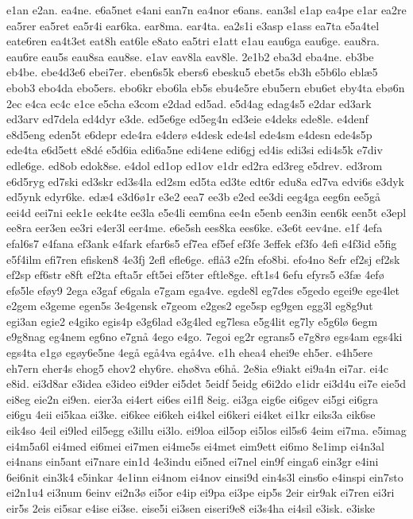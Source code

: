 {e1an
e2an.
ea4ne.
e6a5net
e4ani
ean7n
ea4nor
e6ans.
ean3sl
e1ap
ea4pe
e1ar
ea2re
ea5rer
ea5ret
ea5r4i
ear6ka.
ear8ma.
ear4ta.
ea2s1i
e3asp
e1ass
ea7ta
e5a4tel
eate6ren
ea4t3et
eat8h
eat6le
e8ato
ea5tri
e1att
e1au
eau6ga
eau6ge.
eau8ra.
eau6re
eau5s
eau8sa
eau8se.
e1av
eav8la
eav8le.
2e1b2
eba3d
eba4ne.
eb3be
eb4be.
ebe4d3e6
ebei7er.
eben6s5k
ebers6
ebesku5
ebet5s
eb3h
e5b6lo
eblæ5
ebob3
ebo4da
ebo5ers.
ebo6kr
ebo6la
eb5s
ebu4e5re
ebu5ern
ebu6et
eby4ta
ebø6n
2ec
e4ca
ec4c
e1ce
e5cha
e3com
e2dad
ed5ad.
e5d4ag
edag4s5
e2dar
ed3ark
ed3arv
ed7dela
ed4dyr
e3de.
ed5e6ge
ed5eg4n
ed3eie
e4deks
ede8le.
e4denf
e8d5eng
eden5t
e6depr
ede4ra
e4derø
e4desk
ede4sl
ede4sm
e4desn
ede4s5p
ede4ta
e6d5ett
e8dé
e5d6ia
edi6a5ne
edi4ene
edi6gj
ed4is
edi3si
edi4s5k
e7div
edle6ge.
ed8ob
edok8se.
e4dol
ed1op
ed1ov
e1dr
ed2ra
ed3reg
e5drev.
ed3rom
e6d5ryg
ed7ski
ed3skr
ed3s4la
ed2sm
ed5ta
ed3te
edt6r
edu8a
ed7va
edvi6s
e3dyk
ed5ynk
edyr6ke.
edæ4
e3d6ø1r
e3e2
eea7
ee3b
e2ed
ee3di
eeg4ga
eeg6n
ee5gå
eei4d
eei7ni
eek1e
eek4te
ee3la
e5e4li
eem6na
ee4n
e5enb
een3in
een6k
een5t
e3epl
ee8ra
eer3en
ee3ri
e4er3l
eer4me.
e6e5sh
ees8ka
ees6ke.
e3e6t
eev4ne.
e1f
4efa
efal6s7
e4fana
ef3ank
e4fark
efar6s5
ef7ea
ef5ef
ef3fe
3effek
ef3fo
4efi
e4f3id
e5fig
e5f4ilm
efi7ren
efisken8
4e3fj
2efl
efle6ge.
eflå3
e2fn
efo8bi.
efo4no
8efr
ef2sj
ef2sk
ef2sp
ef6str
e8ft
ef2ta
efta5r
eft5ei
ef5ter
eftle8ge.
eft1s4
6efu
efyrs5
e3fæ
4efø
efø5le
eføy9
2ega
e3gaf
e6gala
e7gam
ega4ve.
egde8l
eg7des
e5gedo
egei9e
ege4let
e2gem
e3geme
egen5s
3e4gensk
e7geom
e2ges2
ege5sp
eg9gen
egg3l
eg8g9ut
egi3an
egie2
e4giko
egis4p
e3g6lad
e3g4led
eg7lesa
e5g4lit
eg7ly
e5g6lø
6egm
e9g8nag
eg4nem
eg6no
e7gnå
4ego
e4go.
7egoi
eg2r
egrans5
e7g8rø
egs4am
egs4ki
egs4ta
e1gø
egøy6e5ne
4egå
egå4va
egå4ve.
e1h
ehea4
ehei9e
eh5er.
e4h5ere
eh7ern
eher4s
ehog5
ehov2
ehy6re.
ehø8va
e6hå.
2e8ia
e9iakt
ei9a4n
ei7ar.
ei4c
e8id.
ei3d8ar
e3idea
e3ideo
ei9der
ei5det
5eidf
5eidg
e6i2do
e1idr
ei3d4u
ei7e
eie5d
ei8eg
eie2n
ei9en.
eier3a
ei4ert
ei6es
ei1fl
8eig.
ei3ga
eig6e
ei6gev
ei5gi
ei6gra
ei6gu
4eii
ei5kaa
ei3ke.
ei6kee
ei6keh
ei4kel
ei6keri
ei4ket
ei1kr
eiks3a
eik6se
eik4so
4eil
ei9led
eil5egg
e3illu
ei3lo.
ei9loa
eil5op
ei5los
eil5s6
4eim
ei7ma.
e5imag
ei4m5a6l
ei4med
ei6mei
ei7men
ei4me5s
ei4met
eim9ett
ei6mo
8e1imp
ei4n3al
ei4nans
ein5ant
ei7nare
ein1d
4e3indu
ei5ned
ei7nel
ein9f
einga6
ein3gr
e4ini
6ei6nit
ein3k4
e5inkar
4e1inn
ei4nom
ei4nov
einsi9d
ein4s3l
eins6o
e4inspi
ein7sto
ei2n1u4
ei3num
6einv
ei2n3ø
ei5or
e4ip
ei9pa
ei3pe
eip5s
2eir
eir9ak
ei7ren
ei3ri
eir5s
2eis
ei5sar
e4ise
ei3se.
eise5i
ei3sen
eiseri9e8
ei3s4ha
ei4sil
e3isk.
e3iske
}
